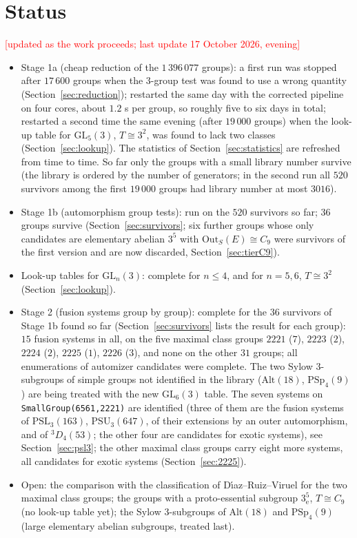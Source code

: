 \documentclass[11pt]{article}
\theoremstyle{definition}
\theoremstyle{remark}
\newcommand{\Out}{\mathrm{Out}}
\newcommand{\GL}{\mathrm{GL}}
\newcommand{\PSL}{\mathrm{PSL}}
\newcommand{\PSU}{\mathrm{PSU}}
\newcommand{\PSp}{\mathrm{PSp}}
\newcommand{\Alt}{\mathrm{Alt}}
\begin{document}
\section{Status}\label{sec:status}
\textcolor{red}{[updated as the work proceeds; last update 17 October 2026, evening]}
\begin{itemize}
\item Stage 1a (cheap reduction of the $1\,396\,077$ groups): a first run
  was stopped after $17\,600$ groups when the $3$-group test was found to use
  a wrong quantity (Section~\ref{sec:reduction}); restarted the same day
  with the corrected pipeline on four cores, about $1.2$ s per group, so
  roughly five to six days in total; restarted a second time the same
  evening (after $19\,000$ groups) when the look-up table for $\GL_5(3)$,
  $T\cong3^2$, was found to lack two classes (Section~\ref{sec:lookup}).
  The statistics of Section~\ref{sec:statistics} are refreshed from time
  to time.  So far only the groups with a small library number survive
  (the library is ordered by the number of generators; in the second run
  all $520$ survivors among the first $19\,000$ groups had library number
  at most $3016$).
\item Stage 1b (automorphism group tests): run on the $520$ survivors so
  far; $36$ groups survive (Section~\ref{sec:survivors}; six further groups
  whose only candidates are elementary abelian $3^5$ with
  $\Out_S(E)\cong C_9$ were survivors of the first version and are now
  discarded, Section~\ref{sec:tierC9}).
\item Look-up tables for $\GL_n(3)$: complete for $n\le 4$, and for $n=5,6$, $T\cong3^2$ (Section~\ref{sec:lookup}).
\item Stage 2 (fusion systems group by group): complete for the $36$
  survivors of Stage 1b found so far (Section~\ref{sec:survivors} lists the
  result for each group): $15$ fusion systems in all, on the five maximal
  class groups $2221$ ($7$), $2223$ ($2$), $2224$ ($2$), $2225$ ($1$),
  $2226$ ($3$), and none on the other $31$ groups; all enumerations of
  automizer candidates were complete.  The two Sylow $3$-subgroups of
  simple groups not identified in the library ($\Alt(18)$, $\PSp_4(9)$) are
  being treated with the new $\GL_6(3)$ table.  The seven systems on
  \texttt{SmallGroup(6561,2221)}
  are identified (three of them are the fusion systems of $\PSL_3(163)$,
  $\PSU_3(647)$, of their extensions by an outer automorphism, and of
  ${}^3D_4(53)$; the other four are candidates for exotic systems), see
  Section~\ref{sec:psl3}; the other maximal class groups carry eight more
  systems, all candidates for exotic systems (Section~\ref{sec:2225}).
\item Open: the comparison with the classification of D\'{\i}az--Ruiz--Viruel
  for the two maximal class groups; the groups with a proto-essential
  subgroup $3^5_{\mathrm e}$, $T\cong C_9$ (no look-up table yet); the Sylow
  $3$-subgroups of $\mathrm{Alt}(18)$ and $\PSp_4(9)$ (large elementary
  abelian subgroups, treated last).
\end{itemize}
\end{document}
